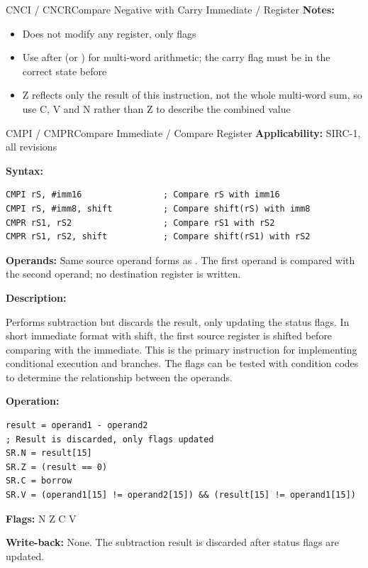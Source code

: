 \begin{instructionbox}{CNCI / CNCR}{Compare Negative with Carry Immediate / Register}
	\textbf{Notes:}
	\begin{itemize}
		\item Does not modify any register, only flags
		\item Use after  (or ) for multi-word arithmetic; the carry flag must be in the correct state
		      before 
		\item Z reflects only the result of this instruction, not the whole multi-word sum, so use C, V and N rather than Z to
		      describe the combined value
	\end{itemize}
\end{instructionbox}

\begin{instructionbox}{CMPI / CMPR}{Compare Immediate / Compare Register}
	\textbf{Applicability:} SIRC-1, all revisions

	\textbf{Syntax:}
	\begin{lstlisting}
CMPI rS, #imm16                ; Compare rS with imm16
CMPI rS, #imm8, shift          ; Compare shift(rS) with imm8
CMPR rS1, rS2                  ; Compare rS1 with rS2
CMPR rS1, rS2, shift           ; Compare shift(rS1) with rS2
\end{lstlisting}

	\textbf{Operands:} Same source operand forms as . The first operand is compared with the second operand;
	no destination register is written.

	\textbf{Description:}

	Performs subtraction but discards the result, only updating the status flags. In short immediate format with shift, the
	first source register is shifted before comparing with the immediate. This is the primary instruction for implementing
	conditional execution and branches. The flags can be tested with condition codes to determine the relationship between
	the operands.

	\textbf{Operation:}
	\begin{verbatim}
result = operand1 - operand2
; Result is discarded, only flags updated
SR.N = result[15]
SR.Z = (result == 0)
SR.C = borrow
SR.V = (operand1[15] != operand2[15]) && (result[15] != operand1[15])
\end{verbatim}

	\textbf{Flags:} N Z C V

	\textbf{Write-back:} None. The subtraction result is discarded after status flags are updated.


\end{instructionbox}
